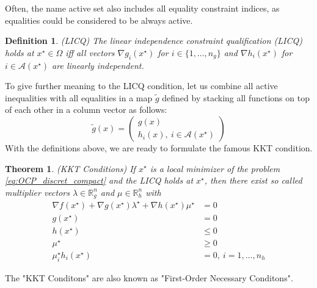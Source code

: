 \documentclass  [
  paper    = a4,
  BCOR     = 10mm,
  twoside,
  fontsize = 12pt,
  fleqn,
  toc      = bibnumbered,
  toc      = listofnumbered,
  numbers  = noendperiod,
  headings = normal,
  listof   = leveldown,
  version  = 3.03
]                                       {scrreprt}
\newcommand{\<}{\langle}
\renewcommand{\>}{\rangle}
\newtheorem{theorem}{Theorem}
\newtheorem{definition}{Definition}
\begin{document}
Often, the name active set also includes all equality constraint indices, as equalities could be considered to be always active. 
\begin{definition} (LICQ) The linear independence constraint qualification (LICQ) holds at $x^\star \in  \Omega $ iff all vectors $\nabla g_i(x^\star)$ for $i \in \{1, ..., n_g \}$ and $\nabla h_i(x^\star)$ for  $i \in \mathcal{A}(x^\star)$ are linearly independent.
	\label{df_LICO}
\end{definition}
To give further meaning to the LICQ condition, let us combine all active inequalities with all equalities in a map $\tilde{g}$ defined by stacking all functions on top of each other in a column vector as follows:
\begin{equation}
	\tilde{g}(x) =  \begin{pmatrix} g(x) \\ h_i(x), \ i \in \mathcal{A}(x^\star)    \end{pmatrix}
\end{equation}
With the definitions above, we are ready to formulate the famous KKT condition. 
\begin{theorem}(KKT Conditions)
	If $x^\star$ is a local minimizer of the problem \ref{eq:OCP_discret_compact} and the LICQ holds at $x^\star$, then there exist
	so called multiplier vectors $\lambda \in \mathbb{R}^n_g$ and $\mu \in \mathbb{R}^n_h$ with 
	\begin{subequations}
		\begin{align}
			\nabla f(x^\star) + \nabla g(x^\star) \lambda^\star +  \nabla h(x^\star) \mu^\star &= 0 \\
			g(x^\star)	 &= 0   \\
			h(x^\star)	&\leq 0  \label{kkt_smaller}\\
			\mu^\star & \geq 0 \\
			\mu_i^\star  h_i(x^\star) &=0 , \  i = 1, ..., n_h \label{kkt_active}
		\end{align}
	\end{subequations}
	\label{TH_KKT}
\end{theorem}
The "KKT Conditons" are also known as "First-Order Necessary Conditons". 
\end{document}
